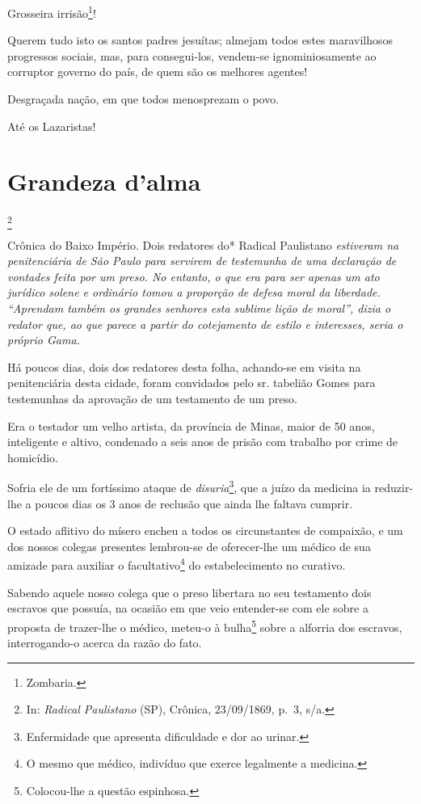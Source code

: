 Grosseira irrisão\footnote{Zombaria.}!

Querem tudo isto os santos padres jesuítas; almejam todos estes
maravilhosos progressos sociais, mas, para consegui-los, vendem-se
ignominiosamente ao corruptor governo do país, de quem são os melhores
agentes!

Desgraçada nação, em que todos menosprezam o povo.

Até os Lazaristas!

\chapter{Grandeza d'alma}\footnote{In: \emph{Radical Paulistano} (SP),
  Crônica, 23/09/1869, p.~3, s/a.}

\begin{didascalia}
Crônica do Baixo Império. Dois redatores do* Radical Paulistano
\emph{estiveram na penitenciária de São Paulo para servirem de
testemunha de uma declaração de vontades feita por um preso. No entanto,
o que era para ser apenas um ato jurídico solene e ordinário tomou a
proporção de defesa moral da liberdade. ``Aprendam também os grandes
senhores esta sublime lição de moral'', dizia o redator que, ao que
parece a partir do cotejamento de estilo e interesses, seria o próprio
Gama.}
\end{didascalia}

\asterisc{}

Há poucos dias, dois dos redatores desta folha, achando-se em visita na
penitenciária desta cidade, foram convidados pelo sr. tabelião Gomes
para testemunhas da aprovação de um testamento de um preso.

Era o testador um velho artista, da província de Minas, maior de 50
anos, inteligente e altivo, condenado a seis anos de prisão com trabalho
por crime de homicídio.

Sofria ele de um fortíssimo ataque de \emph{disuria}\footnote{
  Enfermidade que apresenta dificuldade e dor ao urinar.}, que a juízo
da medicina ia reduzir-lhe a poucos dias os 3 anos de reclusão que ainda
lhe faltava cumprir.

O estado aflitivo do mísero encheu a todos os circunstantes de
compaixão, e um dos nossos colegas presentes lembrou-se de oferecer-lhe
um médico de sua amizade para auxiliar o facultativo\footnote{O mesmo
  que médico, indivíduo que exerce legalmente a medicina.} do
estabelecimento no curativo.

Sabendo aquele nosso colega que o preso libertara no seu testamento dois
escravos que possuía, na ocasião em que veio entender-se com ele sobre a
proposta de trazer-lhe o médico, meteu-o à bulha\footnote{Colocou-lhe
  a questão espinhosa.} sobre a alforria dos escravos, interrogando-o
acerca da razão do fato.

